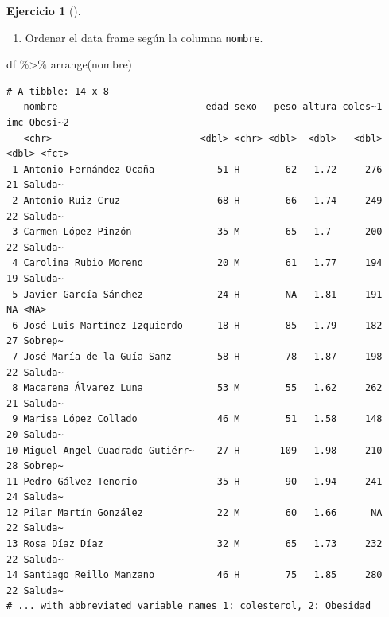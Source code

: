 \documentclass[
  a4paper,
]{scrreport}
\newenvironment{Shaded}{\begin{snugshade}}{\end{snugshade}}
\newcommand{\FunctionTok}[1]{\textcolor[rgb]{0.28,0.35,0.67}{#1}}
\newcommand{\NormalTok}[1]{\textcolor[rgb]{0.00,0.23,0.31}{#1}}
\newcommand{\SpecialCharTok}[1]{\textcolor[rgb]{0.37,0.37,0.37}{#1}}
\providecommand{\tightlist}{%
  \setlength{\itemsep}{0pt}\setlength{\parskip}{0pt}}\usepackage{longtable,booktabs,array}
\theoremstyle{definition}
\newtheorem{exercise}{Ejercicio}[chapter]
\theoremstyle{remark}
\begin{document}
\begin{exercise}[]
\begin{tcolorbox}
\end{tcolorbox}

\begin{enumerate}
\def\labelenumi{\alph{enumi}.}
\setcounter{enumi}{9}
\tightlist
\item
  Ordenar el data frame según la columna \texttt{nombre}.
\end{enumerate}

\begin{tcolorbox}[enhanced jigsaw, coltitle=black, breakable, bottomtitle=1mm, colbacktitle=quarto-callout-tip-color!10!white, rightrule=.15mm, opacityback=0, opacitybacktitle=0.6, left=2mm, colframe=quarto-callout-tip-color-frame, title=\textcolor{quarto-callout-tip-color}{\faLightbulb}\hspace{0.5em}{Solución}, toprule=.15mm, toptitle=1mm, arc=.35mm, colback=white, titlerule=0mm, bottomrule=.15mm, leftrule=.75mm]

\begin{Shaded}
\begin{Highlighting}[]
\NormalTok{df }\SpecialCharTok{\%\textgreater{}\%}
    \FunctionTok{arrange}\NormalTok{(nombre)}
\end{Highlighting}
\end{Shaded}

\begin{verbatim}
# A tibble: 14 x 8
   nombre                          edad sexo   peso altura coles~1   imc Obesi~2
   <chr>                          <dbl> <chr> <dbl>  <dbl>   <dbl> <dbl> <fct>  
 1 Antonio Fernández Ocaña           51 H        62   1.72     276    21 Saluda~
 2 Antonio Ruiz Cruz                 68 H        66   1.74     249    22 Saluda~
 3 Carmen López Pinzón               35 M        65   1.7      200    22 Saluda~
 4 Carolina Rubio Moreno             20 M        61   1.77     194    19 Saluda~
 5 Javier García Sánchez             24 H        NA   1.81     191    NA <NA>   
 6 José Luis Martínez Izquierdo      18 H        85   1.79     182    27 Sobrep~
 7 José María de la Guía Sanz        58 H        78   1.87     198    22 Saluda~
 8 Macarena Álvarez Luna             53 M        55   1.62     262    21 Saluda~
 9 Marisa López Collado              46 M        51   1.58     148    20 Saluda~
10 Miguel Angel Cuadrado Gutiérr~    27 H       109   1.98     210    28 Sobrep~
11 Pedro Gálvez Tenorio              35 H        90   1.94     241    24 Saluda~
12 Pilar Martín González             22 M        60   1.66      NA    22 Saluda~
13 Rosa Díaz Díaz                    32 M        65   1.73     232    22 Saluda~
14 Santiago Reillo Manzano           46 H        75   1.85     280    22 Saluda~
# ... with abbreviated variable names 1: colesterol, 2: Obesidad
\end{verbatim}


\end{tcolorbox}
\end{exercise}
\end{document}
